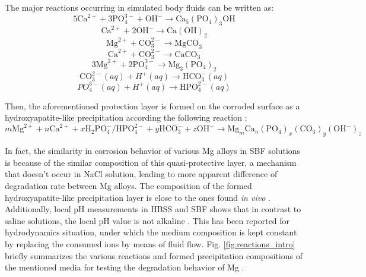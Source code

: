 The major reactions occurring in simulated body fluids can be written as:
\begin{equation}
5 \mathrm{Ca}^{2+}+3 \mathrm{PO}_{4}^{3-}+\mathrm{OH}^{-} \rightarrow \mathrm{Ca}_{5}\left(\mathrm{PO}_{4}\right)_{3} \mathrm{OH}
\end{equation}
\begin{equation}
\mathrm{Ca}^{2+}+2 \mathrm{OH}^{-} \rightarrow \mathrm{Ca}(\mathrm{OH})_{2}
\end{equation}
\begin{equation}
\mathrm{Mg}^{2+}+\mathrm{CO}_{3}^{2-} \rightarrow \mathrm{MgCO}_{3}
\end{equation}
\begin{equation}
\mathrm{Ca}^{2+}+\mathrm{CO}_{3}^{2-} \rightarrow \mathrm{CaCO}_{3}
\end{equation}
\begin{equation}
 3 \mathrm{Mg}^{2+}+2 \mathrm{PO}_{4}^{3-} \rightarrow \mathrm{Mg}_{3}\left(\mathrm{PO}_{4}\right)_{2}
\end{equation}
\begin{equation}
\mathrm{CO}_{3}^{2-}(a q)+H^{+}(a q) \rightarrow \mathrm{HCO}_{3}^{-}(a q)
\end{equation}
\begin{equation}
P O_{4}^{3-}(a q)+H^{+}(a q)\rightarrow \mathrm{HPO}_{4}^{2-}(a q)
\end{equation}

Then, the aforementioned protection layer is formed on the corroded surface as a hydroxyapatite-like precipitation according the following reaction \cite{Atrens2015,Song2009,Silva2018,Jiang2019}:
\begin{equation}
m \mathrm{Mg}^{2+}+n \mathrm{Ca}^{2+}+x \mathrm{H}_{2} \mathrm{PO}_{4}^{-} / \mathrm{HPO}_{4}^{2-}+y \mathrm{HCO}_{3}^{-}+z \mathrm{OH}^{-} \rightarrow \mathrm{Mg}_{m} \mathrm{Ca}_{n}\left(\mathrm{PO}_{4}\right)_{x}\left(\mathrm{CO}_{3}\right)_{y}\left(\mathrm{OH}^{-}\right)_{z}
\end{equation}

In fact, the similarity in corrosion behavior of various Mg alloys in SBF solutions is because of the similar composition of this quasi-protective layer, a mechanism that doesn't occur in NaCl solution, leading to more apparent difference of degradation rate between Mg alloys. The composition of the formed hydroxyapatite-like precipitation layer is close to the ones found \textit{in vivo} \cite{Mei2020}. Additionally, local pH measurements in HBSS and SBF shows that in contrast to saline solutions, the local pH value is not alkaline \cite{Lamaka2018,Mei2021}. This has been reported for hydrodynamics situation, under which the medium composition is kept constant by replacing the consumed ions by means of fluid flow. Fig. \ref{fig:reactions_intro} briefly summarizes the various reactions and formed precipitation compositions of the mentioned media for testing the degradation behavior of Mg \cite{Mei2020}.


